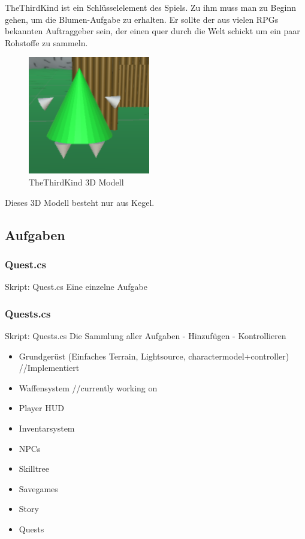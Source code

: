 TheThirdKind ist ein Schlüsselelement des Spiels. Zu ihm muss man zu Beginn gehen, um die Blumen-Aufgabe zu erhalten.
Er sollte der aus vielen RPGs bekannten Auftraggeber sein, der einen quer durch die Welt schickt um ein paar Rohstoffe zu sammeln.
\begin{figure}[H]
\includegraphics[scale=1]{screenshots/t3k.png}
\caption{ TheThirdKind 3D Modell}
\end{figure}
Dieses 3D Modell besteht nur aus Kegel.

\subsection{Aufgaben}

\subsubsection{Quest.cs}
Skript: Quest.cs
Eine einzelne Aufgabe

\subsubsection{Quests.cs}
Skript: Quests.cs
Die Sammlung aller Aufgaben
- Hinzufügen
- Kontrollieren

\begin{itemize}
\item Grundgerüst (Einfaches Terrain, Lightsource, charactermodel+controller) //Implementiert
\item Waffensystem	//currently working on
\item Player HUD
\item Inventarsystem
\item NPCs
\item Skilltree
\item Savegames
\item Story
\item Quests

\end{itemize}



